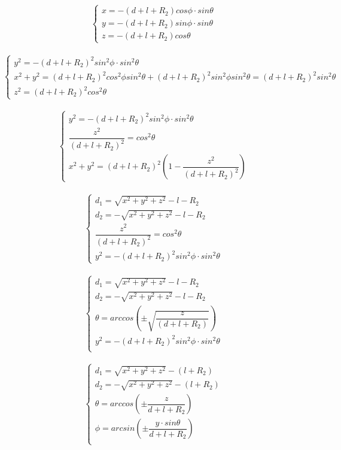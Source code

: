 \documentclass[12pt]{article}
\begin{document}
\[\left\{
\begin{array}{l}
  x = -\left(d+l+R_2\right)cos\phi\cdot sin\theta\\
  y = -\left(d+l+R_2\right)sin\phi\cdot sin\theta\\
  z =-\left(d+l+R_2\right)cos\theta
\end{array} \right.\]
\ 
\[\left\{
\begin{array}{l}
  y^2=-\left(d+l+R_2\right)^2 sin^2 \phi\cdot sin^2 \theta\\
  x^2+y^2 =  \left(d+l+R_2\right)^2 cos^2 \phi sin^2\theta + \left(d+l+R_2\right)^2sin^2 \phi sin^2 \theta = \left(d+l+R_2\right)^2 sin^2 \theta \\
  z^2=\left(d+l+R_2\right)^2 cos^2\theta
\end{array} \right.\]
\ 
\[\left\{
\begin{array}{l}
  y^2=-\left(d+l+R_2\right)^2 sin^2 \phi\cdot sin^2 \theta\\
  \dfrac{z^2}{\left(d+l+R_2\right)^2} = cos^2\theta\\
  x^2+y^2 =  \left(d+l+R_2\right)^2 \left(1-\dfrac{z^2}{\left(d+l+R_2\right)^2} \right) 
\end{array} \right.\]
\ 
\[\left\{
\begin{array}{l}
 d_1 = \sqrt{x^2+y^2+z^2}-l-R_2\\
 d_2 = -\sqrt{x^2+y^2+z^2}-l-R_2\\
  \dfrac{z^2}{\left(d+l+R_2\right)^2} = cos^2\theta\\
    y^2=-\left(d+l+R_2\right)^2 sin^2 \phi\cdot sin^2 \theta
\end{array} \right.\]
\ 
\[\left\{
\begin{array}{l}
 d_1 = \sqrt{x^2+y^2+z^2}-l-R_2\\
 d_2 = -\sqrt{x^2+y^2+z^2}-l-R_2\\
  \theta = arccos\left(\pm\sqrt{\dfrac{z}{\left(d+l+R_2\right)}}\right)\\
   y^2=-\left(d+l+R_2\right)^2 sin^2 \phi\cdot sin^2 \theta\\
\end{array} \right.\]
\ 
\[\left\{
\begin{array}{l}
 d_1 = \sqrt{x^2+y^2+z^2}-\left(l+R_2\right)\\
 d_2 = -\sqrt{x^2+y^2+z^2}-\left(l+R_2\right)\\
  \theta = arccos\left(\pm\dfrac{z}{d+l+R_2}\right)\\
   \phi = arcsin\left(\pm \dfrac{y\cdot sin\theta}{d+l+R_2}\right)\\
\end{array} \right.\]
\end{document}
